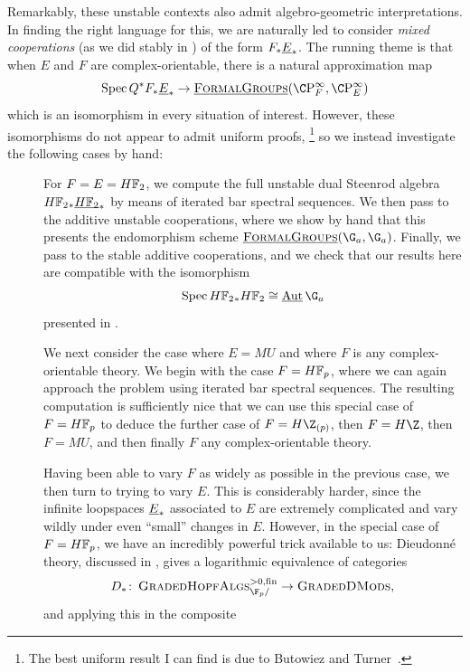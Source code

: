Remarkably, these unstable contexts also admit algebro-geometric interpretations.
In finding the right language for this, we are naturally led to consider \textit{mixed cooperations} (as we did stably in ) of the form \(F_* \OS{E}{*}\).
The running theme is that when \(E\) and \(F\) are complex-orientable, there is a natural approximation map \[\Spec Q^* F_* \OS{E}{*} \to \InternalHom{FormalGroups}(\CP^\infty_F, \CP^\infty_E)\] which is an isomorphism in every situation of interest.
However, these isomorphisms do not appear to admit uniform proofs,%
\footnote{%
The best uniform result I can find is due to Butowiez and Turner~\cite[Theorem 3.12]{ButowiezTurner}.
}
so we instead investigate the following cases by hand:
\begin{description}
\item[{}] For \(F = E = \HFtwo\), we compute the full unstable dual Steenrod algebra \(\HFtwo_* \OS{\HFtwo}{*}\) by means of iterated bar spectral sequences.
We then pass to the additive unstable cooperations, where we show by hand that this presents the endomorphism scheme \(\InternalHom{FormalGroups}(\G_a, \G_a)\).
Finally, we pass to the stable additive cooperations, and we check that our results here are compatible with the isomorphism \[\Spec \HFtwo_* \HFtwo \cong \InternalAut{\G_a}\] presented in .
\item[{}] We next consider the case where \(E = MU\) and where \(F\) is any complex-orientable theory.
We begin with the case \(F = \HFp\), where we can again approach the problem using iterated bar spectral sequences.
The resulting computation is sufficiently nice that we can use this special case of \(F = \HFp\) to deduce the further case of \(F = H\Z_{(p)}\), then \(F = H\Z\), then \(F = MU\), and then finally \(F\) any complex-orientable theory.
\item[{}] Having been able to vary \(F\) as widely as possible in the previous case, we then turn to trying to vary \(E\).
This is considerably harder, since the infinite loopspaces \(\OS{E}{*}\) associated to \(E\) are extremely complicated and vary wildly under even ``small'' changes in \(E\).
However, in the special case of \(F = \HFp\), we have an incredibly powerful trick available to us: Dieudonn\'e theory, discussed in , gives a logarithmic equivalence of categories \[D_*\co \CatOf{GradedHopfAlgs}^{> 0, \fin}_{\F_p/} \to \CatOf{GradedDMods},\] and applying this in the composite

\end{description}
